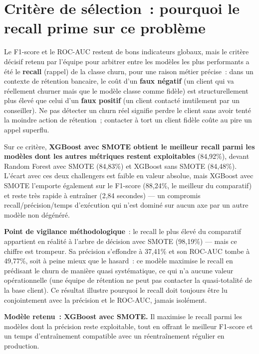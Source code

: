 \documentclass[11pt,a4paper]{report}
\renewenvironment{quote}{\begin{quotebox}}{\end{quotebox}}
\begin{document}
\section{Crit\`ere de s\'election~: pourquoi le recall prime sur ce probl\`eme}

Le F1-score et le ROC-AUC restent de bons indicateurs globaux, mais le crit\`ere
d\'ecisif retenu par l'\'equipe pour arbitrer entre les mod\`eles les plus
performants a \'et\'e le \textbf{recall} (rappel) de la classe churn, pour une
raison m\'etier pr\'ecise~: dans un contexte de r\'etention bancaire, le co\^ut
d'un \textbf{faux n\'egatif} (un client qui va r\'eellement churner mais que le
mod\`ele classe comme fid\`ele) est structurellement plus \'elev\'e que celui d'un
\textbf{faux positif} (un client contact\'e inutilement par un conseiller). Ne
pas d\'etecter un churn r\'eel signifie perdre le client sans avoir tent\'e la
moindre action de r\'etention~; contacter \`a tort un client fid\`ele co\^ute au
pire un appel superflu.

Sur ce crit\`ere, \textbf{XGBoost avec SMOTE obtient le meilleur recall parmi
les mod\`eles dont les autres m\'etriques restent exploitables} (84,92\%),
devant Random Forest avec SMOTE (84,83\%) et XGBoost sans SMOTE (84,48\%).
L'\'ecart avec ces deux challengers est faible en valeur absolue, mais XGBoost
avec SMOTE l'emporte \'egalement sur le F1-score (88,24\%, le meilleur du
comparatif) et reste tr\`es rapide \`a entra\^iner (2,84 secondes) --- un
compromis recall/pr\'ecision/temps d'ex\'ecution qui n'est domin\'e sur aucun
axe par un autre mod\`ele non d\'eg\'en\'er\'e.

\begin{quote}
\textbf{Point de vigilance m\'ethodologique}~: le recall le plus \'elev\'e du
comparatif appartient en r\'ealit\'e \`a l'arbre de d\'ecision avec SMOTE
(98,19\%) --- mais ce chiffre est trompeur. Sa pr\'ecision s'effondre \`a
37,41\% et son ROC-AUC tombe \`a 49,77\%, soit \`a peine mieux que le hasard~:
ce mod\`ele maximise le recall en pr\'edisant le churn de mani\`ere quasi
syst\'ematique, ce qui n'a aucune valeur op\'erationnelle (une \'equipe de
r\'etention ne peut pas contacter la quasi-totalit\'e de la base client). Ce
r\'esultat illustre pourquoi le recall doit toujours \^etre lu conjointement
avec la pr\'ecision et le ROC-AUC, jamais isol\'ement.
\end{quote}

\textbf{Mod\`ele retenu~: XGBoost avec SMOTE.} Il maximise le recall parmi les
mod\`eles dont la pr\'ecision reste exploitable, tout en offrant le meilleur
F1-score et un temps d'entra\^inement compatible avec un r\'eentra\^inement
r\'egulier en production.
\end{document}

